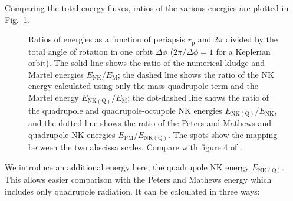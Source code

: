 \documentclass[useAMS,usedcolumn,usegraphicx,usenatbib]{mn2e}
\newcommand{\figref}[1]{Fig.~\ref{fig:#1}}
\newcommand{\sub}[1]{\ensuremath{_\mathrm{#1}}}
\begin{document}
Comparing the total energy fluxes, ratios of the various energies are plotted in \figref{Energy_ratio}.
\begin{figure}
  \begin{center}
    \quad
    \caption{Ratios of energies as a function of periapsis $r\sub{p}$ and $2\pi$ divided by the total angle of rotation in one orbit $\Delta\phi$ ($2\pi/\Delta\phi = 1$ for a Keplerian orbit). The solid line shows the ratio of the numerical kludge and Martel energies $E\sub{NK}/E\sub{M}$; the dashed line shows the ratio of the NK energy calculated using only the mass quadrupole term and the Martel energy $E\sub{NK(Q)}/E\sub{M}$; the dot-dashed line shows the ratio of the quadrupole and quadrupole-octupole NK energies $E\sub{NK(Q)}/E\sub{NK}$, and the dotted line shows the ratio of the Peters and Mathews and quadrupole NK energies $E\sub{PM}/E\sub{NK(Q)}$. The spots show the mapping between the two abscissa scales. Compare with figure 4 of \citet{Gair2005}.\label{fig:Energy_ratio}}
  \end{center}
\end{figure}
We introduce an additional energy here, the quadrupole NK energy $E\sub{NK(Q)}$. This allows easier comparison with the Peters and Mathews energy which includes only quadrupole radiation. It can be calculated in three ways:
\end{document}
